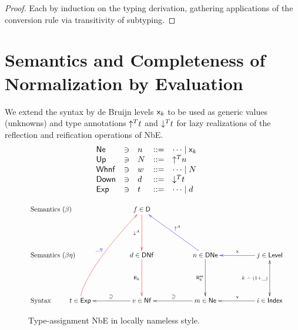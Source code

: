 \documentclass[acmlarge,review,anonymous]{acmart}\settopmatter{printfolios=true}
\begin{document}
\begin{proof}
  Each by induction on the typing derivation, gathering applications of the conversion rule via transitivity of subtyping.
\end{proof}



\section{Semantics and Completeness of Normalization by Evaluation}
\label{sec:sem}

We extend the syntax by de Bruijn levels $\mathsf{x}_{k}$
to be used as generic values (unknowns) and type annotations
$\mathord{\uparrow^{T}} t$ and $\mathord{\downarrow^{T}} t$ for lazy realizations of the
reflection and reification operations of NbE.
\[
\begin{array}{lllrl@{\qquad}l}
  \Ne   & \ni & n & ::= & \dots \mid \lev k \\
  \tUp  & \ni & N & ::= & \up T n \\
  \Whnf & \ni & w & ::= & \dots \mid N \\
  \tDown & \ni & d & ::= & \down T t \\
  \Exp  & \ni & t & ::= & \dots \mid d \\
\end{array}
\]


\begin{figure}
$$
\xymatrix@R=12ex@C=12ex{
\mathrlap{\mbox{Semantics ($\beta$)}} &
  &                f \in \D   \ar@[red][d]_{\down A}
\\
\mathrlap{\mbox{Semantics ($\beta\eta$)}} &
  &                d \in \DNf \ar@[red][d]_{\tR_k{}}
  &                n \in \DNe \ar[d]_{\tRne_k} \ar@[blue][ul]_{\up A}
  & \ar@[blue][l]_{\var{}} j \in \Level \ar@{<->}[d]_{k\dotminus(1+\_)}
\\
\mathrlap{\mbox{Syntax}} &
t \in \Exp \ar@[red]@(u,dl)[uur]^{\_\color{blue}\eta} %
  & \ar[l]_{\supseteq}  v \in \Nf
  & \ar[l]_{\supseteq}  m \in \Ne
  & \ar[l]_{\ind{}}     i \in \Index
  &
}
$$
\caption{Type-assignment NbE in locally nameless
    style.\label{fig:typedchart}}
\end{figure}
\end{document}
